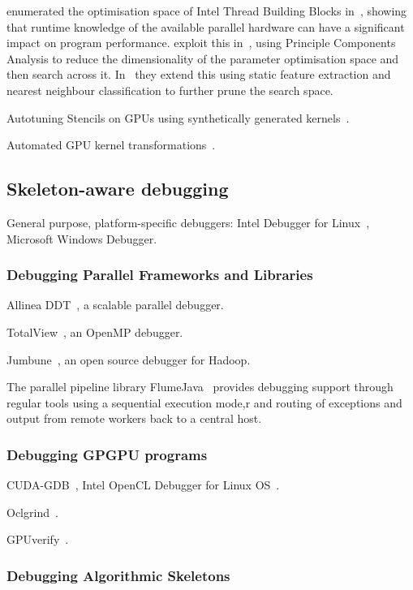 \citeauthor{Contreras2008} enumerated the optimisation space of Intel
Thread Building Blocks in~\cite{Contreras2008}, showing that runtime
knowledge of the available parallel hardware can have a significant
impact on program performance. \citeauthor{Collins2012} exploit this
in~\cite{Collins2012}, using Principle Components Analysis to reduce
the dimensionality of the parameter optimisation space and then search
across it. In~\cite{Collins2013} they extend this using static feature
extraction and nearest neighbour classification to further prune the
search space.

Autotuning Stencils on GPUs using synthetically generated
kernels~\cite{Garvey2015b}.

Automated GPU kernel transformations~\cite{Wahib2015a}.


\subsection{Skeleton-aware debugging}

General purpose, platform-specific debuggers: Intel Debugger for
Linux~\cite{Blair-chappell}, Microsoft Windows Debugger.


\subsubsection{Debugging Parallel Frameworks and Libraries}

Allinea DDT~\cite{K2010}, a scalable parallel debugger.

TotalView~\cite{Cownie2000}, an OpenMP debugger.

Jumbune~\cite{ImpetusTechnologies}, an open source debugger for
Hadoop.

The parallel pipeline library FlumeJava~\cite{Chambers2010} provides
debugging support through regular tools using a sequential execution
mode,r and routing of exceptions and output from remote workers back to
a central host.


\subsubsection{Debugging GPGPU programs}

CUDA-GDB~\cite{NVIDIA2016}, Intel OpenCL Debugger for Linux
OS~\cite{IntelCorporation2016}.

Oclgrind~\cite{Price2015}.

GPUverify~\cite{Betts2012}.


\subsubsection{Debugging Algorithmic Skeletons}

